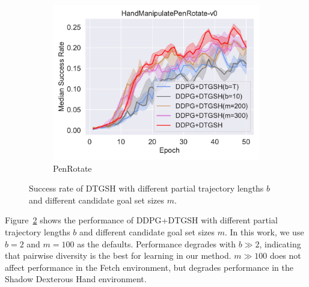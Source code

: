 \begin{figure}[h!]
\begin{subfigure}[t]{0.49\textwidth}
    \includegraphics[width=\textwidth]{figures/chapter4/HandManipulatePenRotate-v0_ab2.pdf}
    \caption{PenRotate}
    \label{subfig:baseline_handpen_ab2}
  \end{subfigure}\hfill
  \caption{Success rate of DTGSH with different partial trajectory lengths $b$ and different candidate goal set sizes $m$. } 
  \label{fig:ablation2}
\end{figure}

Figure~\ref{fig:ablation2} shows the performance of DDPG+DTGSH with different partial trajectory lengths $b$ and different candidate goal set sizes $m$. In this work, we use $b = 2$ and $m = 100$ as the defaults. Performance degrades with $b \gg 2$, indicating that pairwise diversity is the best for learning in our method. $m \gg 100$ does not affect performance in the Fetch environment, but degrades performance in the Shadow Dexterous Hand environment.


